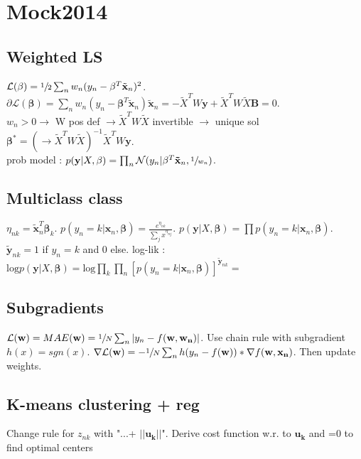 \section{Mock2014}
\subsection{Weighted LS}
$\mathcal{L}(\mathbf{\beta}) = \sfrac{1}{2} \sum_{n}w_n (y_n - \mathbf{\beta}^T\tilde{\mathbf{x}}_n)^2$.\\
$\partial \mathcal{L}(\mathbf{\beta}) = \sum_n w_n(y_n - \mathbf{\beta}^T\tilde{\mathbf{x}}_n)\tilde{\mathbf{x}}_n = -\tilde{X}^T W \mathbf{y} + \tilde{X}^T W \tilde{X} \mathbf{B} = 0$.\\
$w_n > 0 \rightarrow$ W pos def $\rightarrow \tilde{X}^T W \tilde{X}$ invertible $\rightarrow$ unique sol $\mathbf{\beta}^* = (\rightarrow \tilde{X}^T W \tilde{X})^{-1}\tilde{X}^T W \mathbf{y}$.\\
prob model : $p(\mathbf{y} | X, \mathbf{\beta}) = \prod_n \mathcal{N}(y_n | \mathbf{\beta}^T \mathbf{\tilde{x}}_n, \sfrac{1}{w_n})$. 

\subsection{Multiclass class}
$\eta_{nk} = \mathbf{\tilde{x}}_n^T \mathbf{\beta}_k$.
$p(y_n = k | \mathbf{x}_n, \mathbf{\beta}) = \frac{e^{\eta_{nk}}}{\sum_{j} x^{\eta_{nj}}}$.
$p(\mathbf{y} | X, \mathbf{\beta}) = \prod p(y_n = k | \mathbf{x}_n, \mathbf{\beta})$.
$\tilde{\mathbf{y}}_{nk} = 1$ if $y_n = k$ and 0 else.
log-lik : $\text{log} p(\mathbf{y} | X, \mathbf{\beta}) = \text{log} \prod_k \prod_n [p(y_n = k | \mathbf{x}_n, \mathbf{\beta})]^{\tilde{\mathbf{y}}_{nk}} = $

\subsection{Subgradients}
$\mathcal{L}(\mathbf{w}) = MAE(\mathbf{w}) = \sfrac{1}{N} \sum_n |y_n - f(\mathbf{w}, \mathbf{w_n})|$. Use chain rule with subgradient $h(x) = sgn(x)$. $\nabla \mathcal{L}(\mathbf{w}) = - \sfrac{1}{N} \sum_n h(y_n - f(\mathbf{w})) * \nabla f(\mathbf{w}, \mathbf{x_n})$. Then update weights.

\subsection{K-means clustering + reg}
Change rule for $z_{nk}$ with "...+ $||\mathbf{u_k}||$". Derive cost function w.r. to $\mathbf{u_k}$ and =0 to find optimal centers

